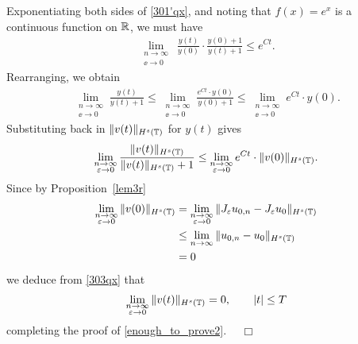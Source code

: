 Exponentiating both sides of \eqref{301'qx}, and noting that $f(x) = e^x$
is a continuous function on $\mathbb{R}$, we must have
\begin{equation*}
\begin{split}
\lim_{\substack{n \to \infty \\ \ee \to 0} } \
\frac{y(t)}{y(0)} \cdot \frac{y(0) + 1}{y(t) + 1} \le e^{C t}.
\end{split}
\end{equation*}
Rearranging, we obtain
\begin{equation*}
\begin{split}
\lim_{\substack{n \to \infty \\ \ee \to 0}} \frac{y(t)}{y(t) + 1}
\le \lim_{\substack{n \to \infty \\ \ee \to 0}} \frac{e^{C t} \cdot y(0)}{y(0) + 1} \le
\lim_{\substack{n \to \infty \\ \ee \to 0}} e^{C t} \cdot y(0).
\end{split}
\end{equation*}
Substituting back in $\|v(t)\|_{H^s(\mathbb{T})}$ for $y(t)$ gives
\begin{equation}
\begin{split}
\lim_{\substack{n \to \infty \\ \varepsilon \to 0}}	\frac{\|v(t)\|_{H^s(\mathbb{T})}}{\|v(t)\|_{H^s(\mathbb{T})} + 1}  \le
\lim_{\substack{n \to \infty \\ \varepsilon \to 0}} e^{C t} \cdot \|v(0)\|_{H^s(\mathbb{T})}.
\label{303qx}
\end{split}
\end{equation}
Since by Proposition~\ref{lem3r} 
\begin{equation*}
\begin{split}
\lim_{\substack{n \to \infty \\ \varepsilon \to 0} }
\|v(0)\|_{H^s(\mathbb{T})}
& = \lim_{\substack{n \to \infty \\ \varepsilon \to 0} }
\|J_\varepsilon u_{0,n} - J_\varepsilon u_0 \|_{H^s(\mathbb{T})} 
\\
& \le \lim_{n \to \infty } \|u_{0,n} - u_0 \|_{H^s(\mathbb{T})}
\\
& = 0
\end{split}
\end{equation*}
we deduce from \eqref{303qx} that
\begin{equation*}
\begin{split}
\lim_{\substack{n \to \infty \\ \varepsilon \to 0}} \|v(t)\|_{H^s(\mathbb{T})} = 0, \qquad |t| \le T
\end{split}
\end{equation*}
completing the proof of \eqref{enough_to_prove2}. $\quad \Box$
%
%
%
